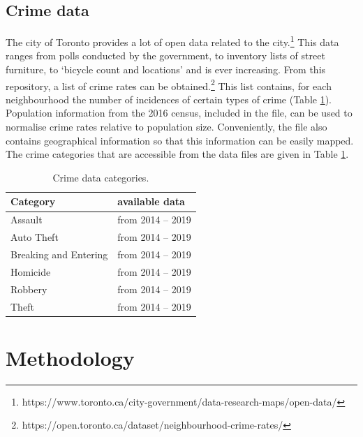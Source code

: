 \documentclass{article}
\begin{document}
\subsection{Crime data}
The city of Toronto provides a lot of open data related to the city.\footnote{https://www.toronto.ca/city-government/data-research-maps/open-data/} This data ranges from polls conducted by the government, to inventory lists of street furniture, to `bicycle count and locations' and is ever increasing. From this repository, a list of crime rates can be obtained.\footnote{https://open.toronto.ca/dataset/neighbourhood-crime-rates/} This list contains, for each neighbourhood the number of incidences of certain types of crime (Table \ref{tab:crime}). Population information from the 2016 census, included in the file, can be used to normalise crime rates relative to population size. Conveniently, the file also contains geographical information so that this information can be easily mapped. The crime categories that are accessible from the data files are given in Table \ref{tab:crime}.
\begin{table}[ht]
\centering
    \begin{tabular}{ll}
    \hline\hline
    Category & available data\\
    \hline
        Assault &  from 2014 -- 2019\\
        Auto Theft &  from 2014 -- 2019\\
        Breaking and Entering &  from 2014 -- 2019\\
        Homicide &  from 2014 -- 2019\\
        Robbery &  from 2014 -- 2019\\
        Theft &  from 2014 -- 2019\\
    \hline
    \end{tabular}
\caption{Crime data categories.}\label{tab:crime}
\end{table}



\section{Methodology}
\end{document}
